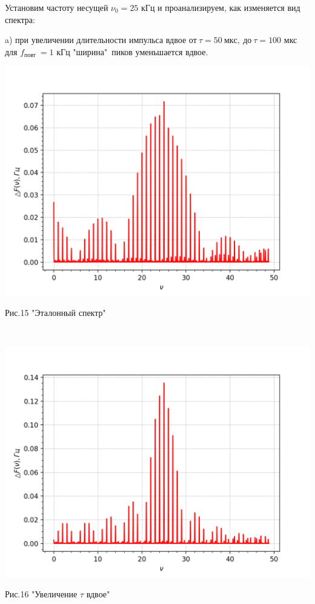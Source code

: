 \documentclass[a4paper,12pt]{article} %
\begin{document}
Установим частоту несущей $\nu_{0}=25$ кГц и проанализируем, как изменяется вид спектра: 


a) при увеличении длительности импульса вдвое $от \ \tau=50\ мкс, \ до\ \tau=100$ мкс для $f_{\text {повт }}=1$ кГц "ширина"\ пиков уменьшается вдвое. \\

\begin{minipage}{0.44\textwidth}
\includegraphics[width=\linewidth]{4.png}\\
\begin{center}
Рис.15 "Эталонный спектр"
\end{center}
\end{minipage}
\begin{minipage}{0.1\textwidth}
\ \ \ \ \ \ \Rightarrow
\end{minipage}
\begin{minipage}{0.44\textwidth}
\includegraphics[width=\linewidth]{5.png}\\
\begin{center}
Рис.16 "Увеличение $\tau$ вдвое"
\end{center}
\end{minipage}
\end{document}
